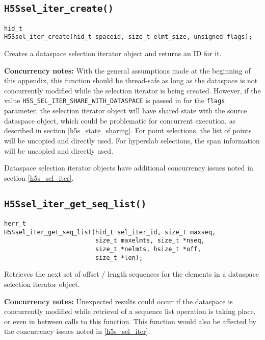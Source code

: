 \documentclass[../HDF5_RFC.tex]{subfiles}
\begin{document}
\subsection{\texttt{H5Ssel\_iter\_create()}}
\label{apdx:h5s_func_h5ssel_iter_create}

\begin{verbatim}
hid_t
H5Ssel_iter_create(hid_t spaceid, size_t elmt_size, unsigned flags);
\end{verbatim}

Creates a dataspace selection iterator object and returns an ID for it.

\textbf{Concurrency notes:} With the general assumptions made at the beginning of this
appendix, this function should be thread-safe as long as the dataspace is not concurrently
modified while the selection iterator is being created. However, if the value
\texttt{H5S\_SEL\_ITER\_SHARE\_WITH\_DATASPACE} is passed in for the \texttt{flags} parameter,
the selection iterator object will have shared state with the source dataspace object, which
could be problematic for concurrent execution, as described in section \ref{h5s_state_sharing}.
For point selections, the list of points will be uncopied and directly used. For hyperslab
selections, the span information will be uncopied and directly used.

Dataspace selection iterator objects have additional concurrency issues noted in section
\ref{h5s_sel_iter}.

\subsection{\texttt{H5Ssel\_iter\_get\_seq\_list()}}
\label{apdx:h5s_func_h5ssel_iter_get_seq_list}

\begin{verbatim}
herr_t
H5Ssel_iter_get_seq_list(hid_t sel_iter_id, size_t maxseq,
                         size_t maxelmts, size_t *nseq,
                         size_t *nelmts, hsize_t *off,
                         size_t *len);
\end{verbatim}

Retrieves the next set of offset / length sequences for the elements in a dataspace selection
iterator object.

\textbf{Concurrency notes:} Unexpected results could occur if the dataspace is concurrently
modified while retrieval of a sequence list operation is taking place, or even in between
calls to this function. This function would also be affected by the concurrency issues noted
in \ref{h5s_sel_iter}.
\end{document}
